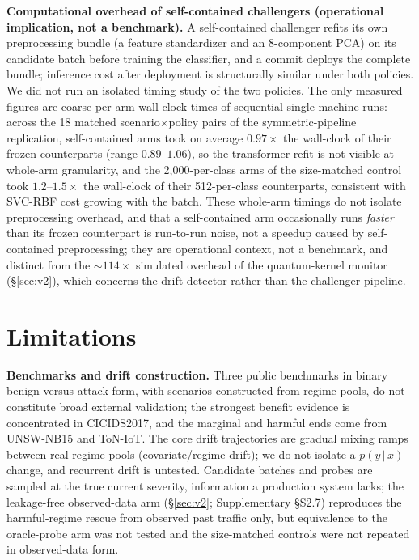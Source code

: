 \documentclass[a4paper,fleqn]{cas-sc}
\begin{document}
\textbf{Computational overhead of self-contained challengers (operational implication, not a benchmark).} A self-contained challenger refits its own preprocessing bundle (a feature standardizer and an 8-component PCA) on its candidate batch before training the classifier, and a commit deploys the complete bundle; inference cost after deployment is structurally similar under both policies. We did not run an isolated timing study of the two policies. The only measured figures are coarse per-arm wall-clock times of sequential single-machine runs: across the 18 matched scenario$\times$policy pairs of the symmetric-pipeline replication, self-contained arms took on average $0.97\times$ the wall-clock of their frozen counterparts (range $0.89$--$1.06$), so the transformer refit is not visible at whole-arm granularity, and the 2{,}000-per-class arms of the size-matched control took $1.2$--$1.5\times$ the wall-clock of their 512-per-class counterparts, consistent with SVC-RBF cost growing with the batch. These whole-arm timings do not isolate preprocessing overhead, and that a self-contained arm occasionally runs \emph{faster} than its frozen counterpart is run-to-run noise, not a speedup caused by self-contained preprocessing; they are operational context, not a benchmark, and distinct from the ${\sim}114\times$ simulated overhead of the quantum-kernel monitor (\S\ref{sec:v2}), which concerns the drift detector rather than the challenger pipeline.


\section{Limitations}


\textbf{Benchmarks and drift construction.} Three public benchmarks in binary benign-versus-attack form, with scenarios constructed from regime pools, do not constitute broad external validation; the strongest benefit evidence is concentrated in CICIDS2017, and the marginal and harmful ends come from UNSW-NB15 and ToN-IoT. The core drift trajectories are gradual mixing ramps between real regime pools (covariate/regime drift); we do not isolate a $p(y\,|\,x)$ change, and recurrent drift is untested. Candidate batches and probes are sampled at the true current severity, information a production system lacks; the leakage-free observed-data arm (\S\ref{sec:v2}; Supplementary \S S2.7) reproduces the harmful-regime rescue from observed past traffic only, but equivalence to the oracle-probe arm was not tested and the size-matched controls were not repeated in observed-data form.
\end{document}
